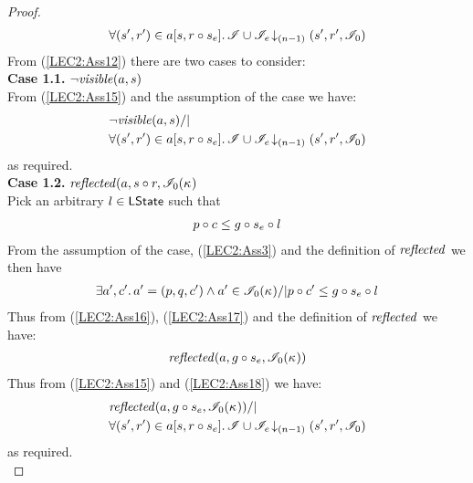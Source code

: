 \begin{lemma}
\begin{proof}
\begin{align}
	\forall (s', r') \in a[s, r \circ s_e].\, \mathscr{I} \cup \mathscr{I}_e \!\downarrow_{(n-1)} \left(s', r', \mathscr{I}_0\right)
	\label{LEC2:Ass15}
\end{align}
%
From (\ref{LEC2:Ass12}) there are two cases to consider:\\
\textbf{Case 1.1. }$\neg\mathit{visible}(a, s)$\\
From (\ref{LEC2:Ass15}) and the assumption of the case we have:
\begin{align*}
	& \neg\mathit{visible}(a, s) /| \\
	& \forall (s', r') \in a[s, r \circ s_e].\, \mathscr{I} \cup \mathscr{I}_e \!\downarrow_{(n-1)} \left(s', r', \mathscr{I}_0\right)
\end{align*}
% 
as required. \\
%
%
%

\noindent\textbf{Case 1.2. }$\mathit{reflected}(a, s \circ r, \mathscr{I}_0(\kappa_{})$\\
Pick an arbitrary $l \in \textsf{LState}$ such that 
\begin{align}
	p \circ c \leq g \circ s_e \circ l \label{LEC2:Ass16}
\end{align} 
%
From the assumption of the case, (\ref{LEC2:Ass3}) and the definition of $\mathit{reflected}$ we then have
%
\begin{align}
	\exists a', c'.\, a' = (p, q, c') \land a' \in \mathscr{I}_0(\kappa_{}) /| p \circ c' \leq g \circ s_e \circ l \label{LEC2:Ass17}
\end{align}
%
Thus from (\ref{LEC2:Ass16}), (\ref{LEC2:Ass17}) and the definition of $\mathit{reflected}$ we have:
%
\begin{align}
	\mathit{reflected}(a, g \circ s_e, \mathscr{I}_0(\kappa_{}))
	\label{LEC2:Ass18}
\end{align}
%
Thus from (\ref{LEC2:Ass15}) and (\ref{LEC2:Ass18}) we have:
\begin{align*}
	& \mathit{reflected}(a, g \circ s_e, \mathscr{I}_0(\kappa_{})) /| \\
	& \forall (s', r') \in a[s, r \circ s_e].\, \mathscr{I} \cup \mathscr{I}_e \!\downarrow_{(n-1)} \left(s', r', \mathscr{I}_0\right)
\end{align*}
%
as required.\\
%
%
%



%


\end{proof}
\end{lemma}
